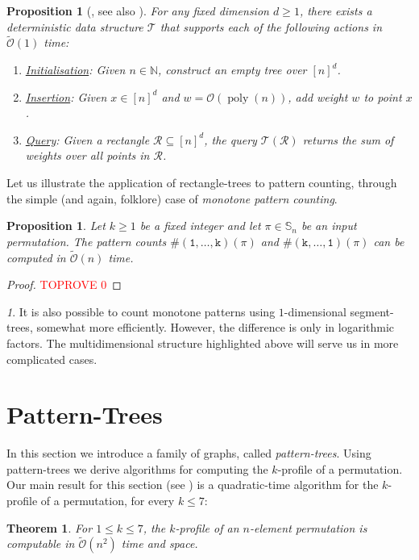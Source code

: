 \documentclass{article}
\newtheorem{proposition}[theorem]{Proposition}
\newcommand{\Sn}{\mathbb{S}_n}
\newcommand{\pc}[2]{{\# \mathtt{ #1 } \left( #2 \right)}}
\DeclareMathOperator{\poly}{poly}
\theoremstyle{remark}
\newtheorem{rem}[theorem]{\protect\remarkname}
\providecommand{\remarkname}{Remark}
\newcommand{\Otilde}[1]{\widetilde{\mathcal{O}}\left( #1 \right)}
\theoremstyle{plain}
\newtheorem{thm}{Theorem}
\begin{document}
\begin{proposition}[\cite{chazelle1988functional, jaja2005space}, see also \cite{dudek2020counting}]
    \label{prop:rect_trees}
    For any fixed dimension $d\ge 1$, there exists a deterministic data structure $\mathcal{T}$ that supports each of the following actions in $\Otilde{1}$ time:
    \begin{enumerate}
        \item  \underline{Initialisation}: Given $n \in \mathbb{N}$, construct an empty tree over $[n]^d$.
        \item \underline{Insertion}: Given $x\in [n]^d$ and $w = \mathcal{O}\left(\poly(n)\right)$, add weight $w$ to point $x$.
        \item \underline{Query}: Given a rectangle $\mathcal{R} \subseteq [n]^d$, the query $\mathcal{T}(\mathcal{R})$ returns the sum of weights over all points in $\mathcal{R}$.
    \end{enumerate}
\end{proposition}
Let us illustrate the application of rectangle-trees to pattern counting, through the simple (and again, folklore) case of \textit{monotone pattern counting}.
\begin{proposition}
    \label{prop:count-123k}
    Let $k\geq 1$ be a fixed integer and let $\pi\in\Sn$ be an input permutation.
    The pattern counts $\pc{(1,\ldots,k)}{\pi}$ and $\pc{(k,\ldots,1)}{\pi}$ can be computed in $\Otilde{n}$ time.
\end{proposition}
\begin{proof}\textcolor{red}{TOPROVE 0}\end{proof}
\begin{rem}
    It is also possible to count monotone patterns using $1$-dimensional segment-trees, somewhat more efficiently.
    However, the difference is only in logarithmic factors.
    The multidimensional structure highlighted above will serve us in more complicated cases.
\end{rem} \section{Pattern-Trees}
\label{sect:pattern_trees}

In this section we introduce a family of graphs, called \textit{pattern-trees}.
Using pattern-trees we derive algorithms for computing the $k$-profile of a permutation.
Our main result for this section (see ) is
a quadratic-time algorithm for the $k$-profile of a permutation, for every $k \le 7$:
\begin{thm}
    \label{thm:fast_le_7_profile}
    For $1 \le k \le 7$, the $k$-profile of an $n$-element permutation is computable in $\Otilde{n^2}$ time and space.
\end{thm}
\end{document}
